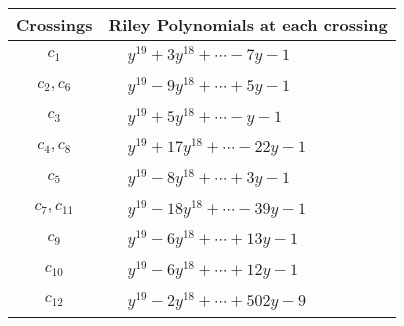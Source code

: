 \documentclass[1p]{elsarticle_modified}
\theoremstyle{definition}
\begin{document}
\begin{tabular}{m{50pt}|m{274pt}}
Crossings & \hspace{64pt}Riley Polynomials at each crossing \\
\hline $$\begin{aligned}c_{1}\end{aligned}$$&$\begin{aligned}
&y^{19}+3 y^{18}+\cdots-7 y-1
\end{aligned}$\\
\hline $$\begin{aligned}c_{2},c_{6}\end{aligned}$$&$\begin{aligned}
&y^{19}-9 y^{18}+\cdots+5 y-1
\end{aligned}$\\
\hline $$\begin{aligned}c_{3}\end{aligned}$$&$\begin{aligned}
&y^{19}+5 y^{18}+\cdots- y-1
\end{aligned}$\\
\hline $$\begin{aligned}c_{4},c_{8}\end{aligned}$$&$\begin{aligned}
&y^{19}+17 y^{18}+\cdots-22 y-1
\end{aligned}$\\
\hline $$\begin{aligned}c_{5}\end{aligned}$$&$\begin{aligned}
&y^{19}-8 y^{18}+\cdots+3 y-1
\end{aligned}$\\
\hline $$\begin{aligned}c_{7},c_{11}\end{aligned}$$&$\begin{aligned}
&y^{19}-18 y^{18}+\cdots-39 y-1
\end{aligned}$\\
\hline $$\begin{aligned}c_{9}\end{aligned}$$&$\begin{aligned}
&y^{19}-6 y^{18}+\cdots+13 y-1
\end{aligned}$\\
\hline $$\begin{aligned}c_{10}\end{aligned}$$&$\begin{aligned}
&y^{19}-6 y^{18}+\cdots+12 y-1
\end{aligned}$\\
\hline $$\begin{aligned}c_{12}\end{aligned}$$&$\begin{aligned}
&y^{19}-2 y^{18}+\cdots+502 y-9
\end{aligned}$\\
\hline
\end{tabular}\\~\\
\end{document}
